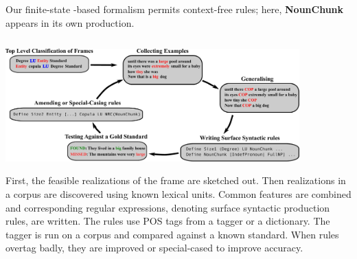 \documentclass[25pt, a0papper, portrait]{tikzposter}
\begin{document}
\begin{columns}
{      %

      \vspace{2cm}

      Our finite-state -based formalism permits context-free rules; here, \textbf{NounChunk} appears in its own production.


}
\end{columns}

 {
   \begin{center}
     \includegraphics[width=0.85\textwidth]{images/sigma.pdf}

   \end{center}
\vspace{1cm}
\begin{changemargin}{5cm}{5cm} 

First, the feasible realizations of the frame are sketched out.
Then realizations in a corpus are discovered using known lexical units.
Common features are combined and corresponding regular expressions, 
denoting surface syntactic production rules, are written. The rules
use POS tags from a tagger or a dictionary.
The tagger is run on a corpus and compared against a known standard.
When rules overtag badly, they are improved or special-cased to improve accuracy.
\end{changemargin} 

 }

\end{document}
